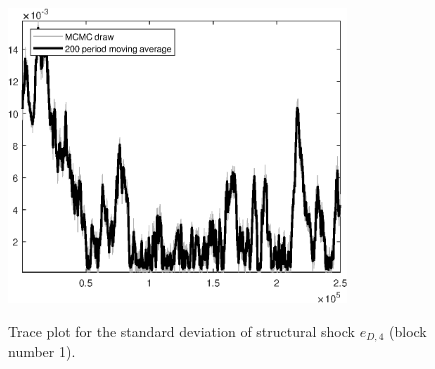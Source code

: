 \begin{figure}[H]
\centering
  \includegraphics[width=0.8\textwidth]{BRS_aggregate/graphs/TracePlot_SE_e_D_news_blck_1}\\
    \caption{Trace plot for the standard deviation of structural shock ${e_{D,4}}$ (block number 1).}
\end{figure}
